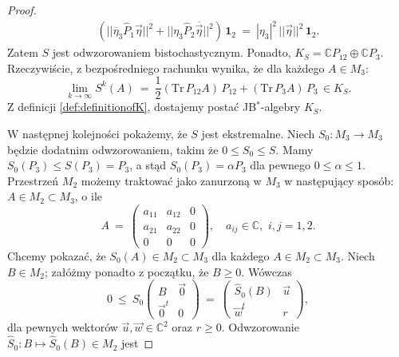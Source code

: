 {\begin{proof}
\begin{multline}
\left( || \overline{\eta}_{3} \hat{P}_{1} \vec{\eta} ||^{2} +
    || \eta_{3} \hat{P}_{2} \overline{\vec{\eta}} ||^{2} \right) \, \mathbf{1}_{2}
    \: = \:
|\eta_{3}|^{2} \, ||\vec{\eta}||^{2} \, \mathbf{1}_{2}.
\end{multline}
Zatem $S$ jest odwzorowaniem bistochastycznym.
Ponadto,
$K_{S}= \mathbb{C} P_{12} \oplus \mathbb{C} P_{3}$.
Rzeczywiście,
z bezpośredniego rachunku wynika, że dla każdego $A \in M_{3}$:
\begin{equation}
\lim \limits_{k \rightarrow \infty} S^{k}(A) \:=\:
\frac{1}{2} (\text{Tr} \, P_{12} A )\, P_{12} +
    (\text{Tr} \, P_{3} A)\, P_{3} \, \in K_{S}.
\end{equation}
Z definicji \eqref{def:definitionofK},
dostajemy postać JB$^{*}$-algebry $K_{S}$.

W następnej kolejności pokażemy, że $S$ jest ekstremalne.
Niech $S_{0}: M_{3} \rightarrow M_{3}$ będzie dodatnim odwzorowaniem,
takim że
$0 \leq S_{0} \leq S$.
Mamy $S_{0}(P_{3}) \leq S(P_{3}) = P_{3}$,
a stąd $S_{0}(P_{3}) = \alpha P_{3}$ dla pewnego $0 \leq \alpha \leq 1$.
Przestrzeń $M_{2}$ możemy traktować jako zanurzoną w $M_{3}$
w następujący sposób:
$A \in M_{2} \! \subset \! M_{3}$, o ile
\begin{equation}
\label{RandomLabel:450031}
    A \: = \: \left( \begin{array}{ccc}
    a_{11} & a_{12} & 0 \\
    a_{21} & a_{22} & 0 \\
    0 & 0 & 0
    \end{array} \right), \quad
    a_{ij} \in \mathbb{C}, \,\, i,j = 1,2.
\end{equation}
Chcemy pokazać, że $S_{0}(A) \in M_{2} \! \subset \! M_{3}$
dla każdego $A \in M_{2} \! \subset \! M_{3}$.
Niech $B \in M_{2}$; załóżmy ponadto z początku, że $B \geq 0$.
Wówczas
\begin{equation}
\label{eq:SMapsM2intoM2}
 0 \:\leq\: S_{0} \begin{pmatrix}
               B & \vec{0} \\ \vec{0}^{t} & 0
              \end{pmatrix} \: = \:
 \begin{pmatrix}
  \hat{S}_{0}(B) & \vec{u} \\ \vec{w}^{t} & r
 \end{pmatrix},
\end{equation}
dla pewnych wektorów $\vec{u}, \vec{w} \in \mathbb{C}^{2}$ oraz $r \geq 0$.
Odwzorowanie $\hat{S}_{0}:B \mapsto \hat{S}_{0}(B) \in M_{2}$ jest

\end{proof}}
